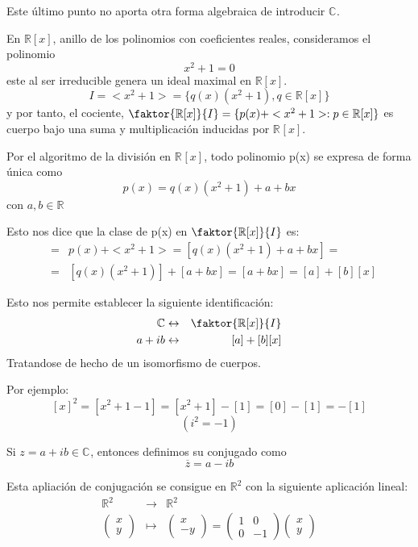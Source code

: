 Este último punto no aporta otra forma algebraica de introducir \(\mathbb{C}^{}\).

En \(\mathbb{R}[x]\), anillo de los polinomios con coeficientes reales, consideramos el polinomio
\[x^2+1=0\]
este al ser irreducible genera un ideal maximal en  \(\mathbb{R}[x]\).
\[ I = <x^2+1> = \{q(x)(x^2+1), q \in \mathbb{R}[x]\}\]
y por tanto, el cociente, \(\faktor{\mathbb{R}[x]}{I} = \{p(x)+<x^2+1> : p \in \mathbb{R}[x]\}\) es cuerpo bajo una suma y multiplicación inducidas por \(\mathbb{R}^{}[x]\).

Por el algoritmo de la división en \(\mathbb{R}^{}[x]\), todo polinomio p(x) se expresa de forma única como
\[p(x) = q(x)(x^2+1) + a +bx\]
con \(a,b \in \mathbb{R}^{}\)

Esto nos dice que la clase de p(x) en \(\faktor{\mathbb{R}[x]}{I}\) es:
\begin{eqnarray*}
[p(x)] & = & p(x) + <x^2+1> = [q(x)(x^2+1)+a+bx] = \\
       & = & [q(x)(x^2+1)] + [a+bx] = [a+bx] = [a]+[b][x]
\end{eqnarray*}

Esto nos permite establecer la siguiente identificación:
\begin{eqnarray*}
  \mathbb{C} & \leftrightarrow & \faktor{\mathbb{R}[x]}{I} \\
        a+ib & \leftrightarrow & [a]+[b][x]
\end{eqnarray*}
Tratandose de hecho de un isomorfismo de cuerpos.

Por ejemplo:
\[[x]^2=[x^2+1-1]=[x^2+1]-[1] = [0] - [1] = -[1]\]
\[(i^2 = -1)\]

\begin{definicion}
  Si \(z = a+ib \in \mathbb{C}^{}\), entonces definimos su conjugado como
  \[ \overline{z} = a-ib\]
\end{definicion}

Esta apliación de conjugación se consigue en \(\mathbb{R}^{2}\) con la siguiente aplicación lineal:
\begin{eqnarray*}
  \mathbb{R}^{2} & \longrightarrow & \mathbb{R}^{2} \\
\begin{pmatrix}
x\\
y
\end{pmatrix} & \longmapsto &
\begin{pmatrix}
x\\
-y
\end{pmatrix} = \begin{pmatrix}
1 & 0\\
0 & -1
\end{pmatrix} \begin{pmatrix}
x\\
y
\end{pmatrix} 
\end{eqnarray*}

